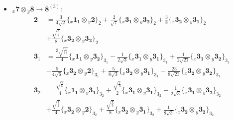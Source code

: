 \documentclass[english]{article}
\newcommand{\rep}[1]{\mathbf{#1}}
\newcommand{\repx}[2]{{}_{#2}\mathbf{#1}}
\newcommand{\subcg}[3]{\big\{ \repx{#1}{x}\otimes\repx{#2}{y}\big\}^{}_{#3}}
\begin{document}
\begin{itemize}
\begin{align*}
\end{align*}
\item $\repx{7}{x}\otimes\repx{8}{y}\to\rep{8}^{(3)}$:
\begin{align*}
\rep{2} & = \frac{3}{4 \sqrt{2}}\subcg{1_{1}}{2}{2}+\frac{2}{\sqrt{7}}\subcg{3_{1}}{3_{2}}{2}+\frac{3}{8}\subcg{3_{2}}{3_{1}}{2} \\ 
 & +\frac{\sqrt{\frac{3}{7}}}{8}\subcg{3_{2}}{3_{2}}{2}
\\
\rep{3}_{1} & = \frac{3 \sqrt{\frac{3}{14}}}{4}\subcg{1_{1}}{3_{2}}{3_{1}}-\frac{1}{2 \sqrt{3}}\subcg{3_{1}}{3_{1}}{3_{1}}+\frac{1}{2 \sqrt{21}}\subcg{3_{1}}{3_{2}}{3_{1}} \\ 
 & -\frac{5}{4 \sqrt{6}}\subcg{3_{2}}{2}{3_{1}}+\frac{5}{8 \sqrt{3}}\subcg{3_{2}}{3_{1}}{3_{1}}-\frac{23}{8 \sqrt{21}}\subcg{3_{2}}{3_{2}}{3_{1}}
\\
\rep{3}_{2} & = \frac{\sqrt{\frac{7}{6}}}{4}\subcg{1_{1}}{3_{1}}{3_{2}}+\frac{\sqrt{\frac{7}{3}}}{2}\subcg{3_{1}}{3_{1}}{3_{2}}-\frac{1}{2 \sqrt{3}}\subcg{3_{1}}{3_{2}}{3_{2}} \\ 
 & +\frac{\sqrt{\frac{7}{2}}}{4}\subcg{3_{2}}{2}{3_{2}}+\frac{\sqrt{\frac{7}{3}}}{8}\subcg{3_{2}}{3_{1}}{3_{2}}+\frac{1}{8 \sqrt{3}}\subcg{3_{2}}{3_{2}}{3_{2}}
\end{align*}
\end{itemize}
\end{document}
